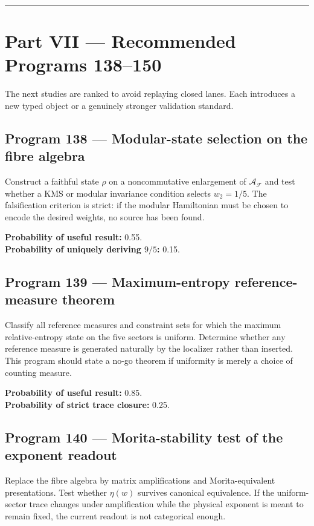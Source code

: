 \documentclass[11pt,a4paper,openany]{report}
\begin{document}
\par\medskip\hrule\medskip

\chapter{Part VII --- Recommended Programs 138--150}

The next studies are ranked to avoid replaying closed lanes. Each introduces a new typed object or a genuinely stronger validation standard.

\section{Program 138 --- Modular-state selection on the fibre algebra}

Construct a faithful state \(\rho\) on a noncommutative enlargement of \(\mathcal A_{\mathcal F}\) and test whether a KMS or modular invariance condition selects \(w_2=1/5\). The falsification criterion is strict: if the modular Hamiltonian must be chosen to encode the desired weights, no source has been found.

\textbf{Probability of useful result:} 0.55.\\
\textbf{Probability of uniquely deriving \(9/5\):} 0.15.

\section{Program 139 --- Maximum-entropy reference-measure theorem}

Classify all reference measures and constraint sets for which the maximum relative-entropy state on the five sectors is uniform. Determine whether any reference measure is generated naturally by the localizer rather than inserted. This program should state a no-go theorem if uniformity is merely a choice of counting measure.

\textbf{Probability of useful result:} 0.85.\\
\textbf{Probability of strict trace closure:} 0.25.

\section{Program 140 --- Morita-stability test of the exponent readout}

Replace the fibre algebra by matrix amplifications and Morita-equivalent presentations. Test whether \(\eta(w)\) survives canonical equivalence. If the uniform-sector trace changes under amplification while the physical exponent is meant to remain fixed, the current readout is not categorical enough.
\end{document}
